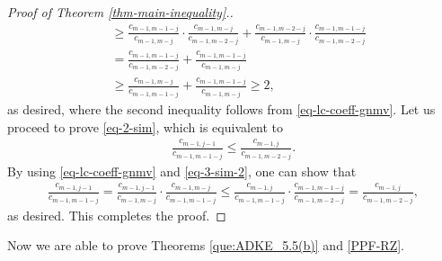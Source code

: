 \documentclass[12pt]{article}
\numberwithin{equation}{section}
\begin{document}
\begin{proof}[Proof of Theorem \ref{thm-main-inequality}.]
\begin{align*}
    & 
   \ge \frac{c_{m-1,m-1-j}}{c_{m-1,m-j}}\cdot\frac{c_{m-1,m-j}}{c_{m-1,m-2-j}}+\frac{c_{m-1,m-2-j}}{c_{m-1,m-j}}\cdot\frac{c_{m-1,m-1-j}}{c_{m-1,m-2-j}} \\[5pt]
     & =\frac{c_{m-1,m-1-j}}{c_{m-1,m-2-j}}+\frac{c_{m-1,m-1-j}}{c_{m-1,m-j}}\\[5pt]
     & \geq \frac{c_{m-1,m-j}}{c_{m-1,m-1-j}}+\frac{c_{m-1,m-1-j}}{c_{m-1,m-j}}\geq 2,
 \end{align*}
 as desired, where the second inequality follows from  \eqref{eq-lc-coeff-gnmv}. 
Let us proceed to prove \eqref{eq-2-sim}, which is equivalent to
\begin{align*}%
\frac{c_{m-1,j-1}} {c_{m-1,m-1-j}}
\le
\frac{c_{m-1,j}}{c_{m-1,m-2-j}}.
\end{align*}
By using \eqref{eq-lc-coeff-gnmv} and \eqref{eq-3-sim-2}, one can show that
\begin{align*}
\frac{c_{m-1,j-1}} {c_{m-1,m-1-j}}
=\frac{c_{m-1,j-1}}{c_{m-1,m-j}} \cdot \frac{c_{m-1,m-j}}{c_{m-1,m-1-j}} 
\le
\frac{c_{m-1,j}}{c_{m-1,m-1-j}} \cdot \frac{c_{m-1,m-1-j}}{c_{m-1,m-2-j}}
=\frac{c_{m-1,j}}{c_{m-1,m-2-j}},
\end{align*}
as desired.
This completes the proof.
\end{proof}

Now we are able to prove Theorems \ref{que:ADKE_5.5(b)} and \ref{PPF-RZ}.
\end{document}
